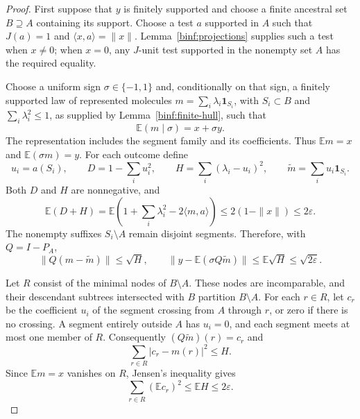 \begin{proof}
First suppose that $y$ is finitely supported and choose a finite ancestral
set $B\supseteq A$ containing its support. Choose a test $a$ supported in
$A$ such that $J(a)=1$ and $\langle x,a\rangle=\|x\|$. Lemma~\ref{binf:projections} supplies such a test when $x\ne0$; when $x=0$, any $J$-unit test
supported in the nonempty set $A$ has the required equality.

Choose a uniform sign $\sigma\in\{-1,1\}$ and, conditionally on that sign,
a finitely supported law of represented molecules
$m=\sum_i\lambda_i\mathbf1_{S_i}$, with $S_i\subset B$ and
$\sum_i\lambda_i^2\le1$, as supplied by Lemma~\ref{binf:finite-hull},
such that
\[
 \mathbb E(m\mid\sigma)=x+\sigma y.
\]
The representation includes the segment family and its coefficients. Thus
$\mathbb Em=x$ and $\mathbb E(\sigma m)=y$. For each outcome define
\[
 u_i=a(S_i),\qquad D=1-\sum_i u_i^2,\qquad
 H=\sum_i(\lambda_i-u_i)^2,\qquad
 \widetilde m=\sum_i u_i\mathbf1_{S_i}.
\]
Both $D$ and $H$ are nonnegative, and
\begin{equation}\label{molc:joint-budget}
 \mathbb E(D+H)
 =\mathbb E\left(1+\sum_i\lambda_i^2-2\langle m,a\rangle\right)
 \le 2(1-\|x\|)\le2\varepsilon.
\end{equation}
The nonempty suffixes $S_i\setminus A$ remain disjoint segments. Therefore,
with $Q=I-P_A$,
\begin{equation}\label{molc:replacement}
 \|Q(m-\widetilde m)\|\le\sqrt H,
 \qquad
 \|y-\mathbb E(\sigma Q\widetilde m)\|
 \le\mathbb E\sqrt H\le\sqrt{2\varepsilon}.
\end{equation}

Let $R$ consist of the minimal nodes of $B\setminus A$. These nodes are
incomparable, and their descendant subtrees intersected with $B$
partition $B\setminus A$.
For each
$r\in R$, let $c_r$ be the coefficient $u_i$ of the segment crossing from
$A$ through $r$, or zero if there is no crossing. A segment entirely
outside $A$ has $u_i=0$, and each segment meets at most one member of $R$.
Consequently $(Q\widetilde m)(r)=c_r$ and
\[
 \sum_{r\in R}|c_r-m(r)|^2\le H.
\]
Since $\mathbb Em=x$ vanishes on $R$, Jensen's inequality gives
\begin{equation}\label{molc:frontier-mean}
 \sum_{r\in R}(\mathbb Ec_r)^2\le\mathbb EH\le2\varepsilon.
\end{equation}


\end{proof}
